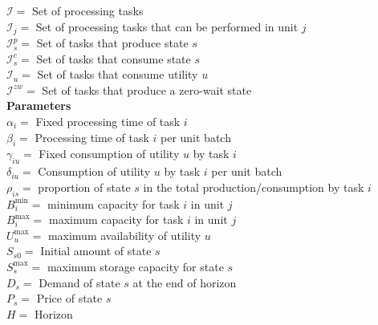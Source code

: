$\mathcal{I} = $ Set of processing tasks \\
$\mathcal{I}_j = $ Set of processing tasks that can be performed in unit $j$\\
$\mathcal{I}_s^p = $ Set of tasks that produce state $s$\\
$\mathcal{I}_s^c = $ Set of tasks that consume state $s$\\
$\mathcal{I}_u = $ Set of tasks that consume utility $u$\\
$\mathcal{I}^{zw} = $ Set of tasks that produce a zero-wait state \\
\textbf{Parameters} \\
$\alpha_i = $ Fixed processing time of task $i$ \\
$\beta_i = $ Processing time of task $i$ per unit batch \\
$\gamma_{iu} = $ Fixed consumption of utility $u$ by task $i$ \\
$\delta_{iu} = $ Consumption of utility $u$ by task $i$ per unit batch \\
$\rho_{is} = $ proportion of state $s$ in the total production/consumption by task $i$ \\
$B_i^{\text{min}} = $ minimum capacity for task $i$ in unit $j$ \\
$B_i^{\text{max}} = $ maximum capacity for task $i$ in unit $j$ \\
$U_u^{\text{max}} = $ maximum availability of utility $u$ \\
$S_{s0} = $ Initial amount of state $s$ \\
$S_{s}^{\text{max}} = $ maximum storage capacity for state $s$ \\
$D_s = $ Demand of state $s$ at the end of horizon \\
$P_s = $ Price of state $s$ \\
$H = $ Horizon



